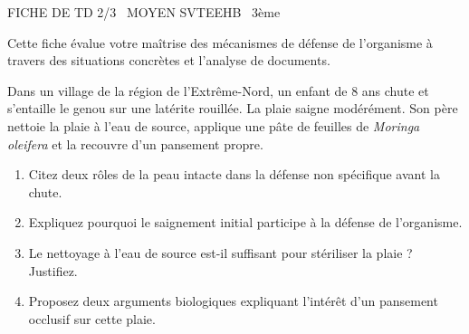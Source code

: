 \documentclass[11pt]{article}
\begin{document}
\begin{tcolorbox}[enhanced,colback=popink,colframe=popink,arc=10pt,boxrule=0pt,left=12pt,right=12pt,top=9pt,bottom=9pt]
{\color{white}\popxbold\small FICHE DE TD 2/3 \textbullet\ MOYEN \hfill SVTEEHB \textbullet\ 3ème\par}
\end{tcolorbox}
\vspace{4pt}
Cette fiche évalue votre maîtrise des mécanismes de défense de l'organisme à travers des situations concrètes et l'analyse de documents.

\begin{exercice}
Dans un village de la région de l'Extrême-Nord, un enfant de 8 ans chute et s'entaille le genou sur une latérite rouillée. La plaie saigne modérément. Son père nettoie la plaie à l'eau de source, applique une pâte de feuilles de \textit{Moringa oleifera} et la recouvre d'un pansement propre.
\begin{enumerate}
    \item Citez deux rôles de la peau intacte dans la défense non spécifique avant la chute.
    \item Expliquez pourquoi le saignement initial participe à la défense de l'organisme.
    \item Le nettoyage à l'eau de source est-il suffisant pour stériliser la plaie ? Justifiez.
    \item Proposez deux arguments biologiques expliquant l'intérêt d'un pansement occlusif sur cette plaie.
\end{enumerate}
\end{exercice}
\end{document}
